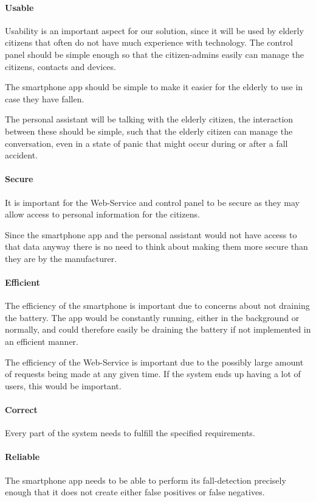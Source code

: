 \paragraph{Usable}
Usability is an important aspect for our solution, since it will be used by elderly citizens that often do not have much experience with technology. 
The control panel should be simple enough so that the citizen-admins easily can manage the citizens, contacts and devices.

The smartphone app should be simple to make it easier for the elderly to use in case they have fallen. 

The personal assistant will be talking with the elderly citizen, the interaction between these should be simple, such that the elderly citizen can manage the conversation, even in a state of panic that might occur during or after a fall accident.

\paragraph{Secure}
It is important for the Web-Service and control panel to be secure as they may allow access to personal information for the citizens.

Since the smartphone app and the personal assistant would not have access to that data anyway there is no need to think about making them more secure than they are by the manufacturer.

\paragraph{Efficient}
The efficiency of the smartphone is important due to concerns about not draining the battery. The app would be constantly running, either in the background or normally, and could therefore easily be draining the battery if not implemented in an efficient manner.

The efficiency of the Web-Service is important due to the possibly large amount of requests being made at any given time. If the system ends up having a lot of users, this would be important.

\paragraph{Correct}
Every part of the system needs to fulfill the specified requirements.

\paragraph{Reliable}
The smartphone app needs to be able to perform its fall-detection precisely enough that it does not create either false positives or false negatives.

